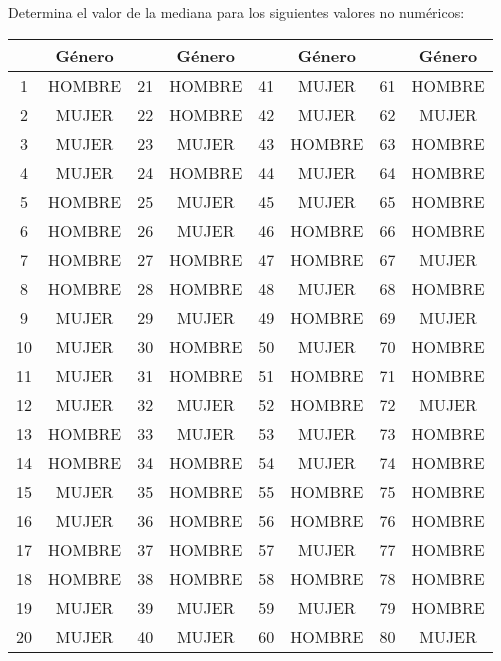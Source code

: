\documentclass{article}
\begin{document}
Determina el valor de la mediana para los siguientes valores no numéricos:
\begin{table}[!h]
    \centering
    \begin{tabular}{|c|c|c|c|c|c|c|c|}
        \hline
        \textbf{} & \textbf{Género} & \textbf{} & \textbf{Género} & \textbf{} & \textbf{Género} & \textbf{} & \textbf{Género} \\ \hline
        1  & HOMBRE & 21 & HOMBRE & 41 & MUJER  & 61 & HOMBRE \\ \hline
        2  & MUJER  & 22 & HOMBRE & 42 & MUJER  & 62 & MUJER  \\ \hline
        3  & MUJER  & 23 & MUJER  & 43 & HOMBRE & 63 & HOMBRE \\ \hline
        4  & MUJER  & 24 & HOMBRE & 44 & MUJER  & 64 & HOMBRE \\ \hline
        5  & HOMBRE & 25 & MUJER  & 45 & MUJER  & 65 & HOMBRE \\ \hline
        6  & HOMBRE & 26 & MUJER  & 46 & HOMBRE & 66 & HOMBRE \\ \hline
        7  & HOMBRE & 27 & HOMBRE & 47 & HOMBRE & 67 & MUJER  \\ \hline
        8  & HOMBRE & 28 & HOMBRE & 48 & MUJER  & 68 & HOMBRE \\ \hline
        9  & MUJER  & 29 & MUJER  & 49 & HOMBRE & 69 & MUJER  \\ \hline
        10 & MUJER  & 30 & HOMBRE & 50 & MUJER  & 70 & HOMBRE \\ \hline
        11 & MUJER  & 31 & HOMBRE & 51 & HOMBRE & 71 & HOMBRE \\ \hline
        12 & MUJER  & 32 & MUJER  & 52 & HOMBRE & 72 & MUJER  \\ \hline
        13 & HOMBRE & 33 & MUJER  & 53 & MUJER  & 73 & HOMBRE \\ \hline
        14 & HOMBRE & 34 & HOMBRE & 54 & MUJER  & 74 & HOMBRE \\ \hline
        15 & MUJER  & 35 & HOMBRE & 55 & HOMBRE & 75 & HOMBRE \\ \hline
        16 & MUJER  & 36 & HOMBRE & 56 & HOMBRE & 76 & HOMBRE \\ \hline
        17 & HOMBRE & 37 & HOMBRE & 57 & MUJER  & 77 & HOMBRE \\ \hline
        18 & HOMBRE & 38 & HOMBRE & 58 & HOMBRE & 78 & HOMBRE \\ \hline
        19 & MUJER  & 39 & MUJER  & 59 & MUJER  & 79 & HOMBRE \\ \hline
        20 & MUJER  & 40 & MUJER  & 60 & HOMBRE & 80 & MUJER  \\ \hline
    \end{tabular}
\end{table}
\end{document}
